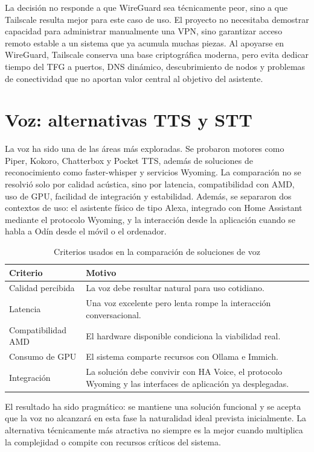 La decisión no responde a que WireGuard sea técnicamente peor, sino a que Tailscale resulta mejor para este caso de uso. El proyecto no necesitaba demostrar capacidad para administrar manualmente una VPN, sino garantizar acceso remoto estable a un sistema que ya acumula muchas piezas. Al apoyarse en WireGuard, Tailscale conserva una base criptográfica moderna, pero evita dedicar tiempo del TFG a puertos, DNS dinámico, descubrimiento de nodos y problemas de conectividad que no aportan valor central al objetivo del asistente.

\section{Voz: alternativas TTS y STT}
La voz ha sido una de las áreas más exploradas. Se probaron motores como Piper, Kokoro, Chatterbox y Pocket TTS, además de soluciones de reconocimiento como faster-whisper y servicios Wyoming. La comparación no se resolvió solo por calidad acústica, sino por latencia, compatibilidad con AMD, uso de GPU, facilidad de integración y estabilidad. Además, se separaron dos contextos de uso: el asistente físico de tipo Alexa, integrado con Home Assistant mediante el protocolo Wyoming, y la interacción desde la aplicación cuando se habla a Odín desde el móvil o el ordenador.

\begin{table}[H]
  \centering
  \caption{Criterios usados en la comparación de soluciones de voz}
  \label{tab:comparativa-voz}
  \begin{tabularx}{\textwidth}{lX}
    \toprule
    Criterio & Motivo \\
    \midrule
    Calidad percibida & La voz debe resultar natural para uso cotidiano. \\
    Latencia & Una voz excelente pero lenta rompe la interacción conversacional. \\
    Compatibilidad AMD & El hardware disponible condiciona la viabilidad real. \\
    Consumo de GPU & El sistema comparte recursos con Ollama e Immich. \\
    Integración & La solución debe convivir con HA Voice, el protocolo Wyoming y las interfaces de aplicación ya desplegadas. \\
    \bottomrule
  \end{tabularx}
\end{table}

El resultado ha sido pragmático: se mantiene una solución funcional y se acepta que la voz no alcanzará en esta fase la naturalidad ideal prevista inicialmente. La alternativa técnicamente más atractiva no siempre es la mejor cuando multiplica la complejidad o compite con recursos críticos del sistema.

